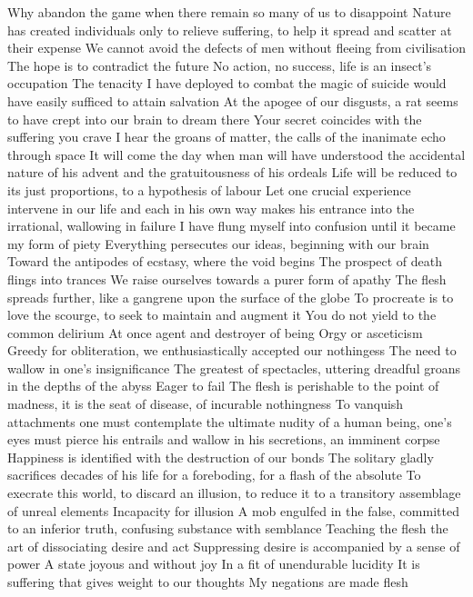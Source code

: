 \documentclass{article}
\begin{document}
Why abandon the game when there remain so many of us to disappoint
Nature has created individuals only to relieve suffering, to help it spread and scatter at their expense
We cannot avoid the defects of men without fleeing from civilisation
The hope is to contradict the future
No action, no success, life is an insect's occupation
The tenacity I have deployed to combat the magic of suicide would have easily sufficed to attain salvation
At the apogee of our disgusts, a rat seems to have crept into our brain to dream there
Your secret coincides with the suffering you crave
I hear the groans of matter, the calls of the inanimate echo through space
It will come the day when man will have understood the accidental nature of his advent and the gratuitousness of his ordeals
Life will be reduced to its just proportions, to a hypothesis of labour
Let one crucial experience intervene in our life and each in his own way makes his entrance into the irrational, wallowing in failure
I have flung myself into confusion until it became my form of piety
Everything persecutes our ideas, beginning with our brain
Toward the antipodes of ecstasy, where the void begins
The prospect of death flings into trances
We raise ourselves towards a purer form of apathy
The flesh spreads further, like a gangrene upon the surface of the globe
To procreate is to love the scourge, to seek to maintain and augment it
You do not yield to the common delirium
At once agent and destroyer of being
Orgy or asceticism
Greedy for obliteration, we enthusiastically accepted our nothingess
The need to wallow in one's insignificance
The greatest of spectacles, uttering dreadful groans in the depths of the abyss
Eager to fail
The flesh is perishable to the point of madness, it is the seat of disease, of incurable nothingness
To vanquish attachments one must contemplate the ultimate nudity of a human being, one's eyes must pierce his entrails and wallow in his secretions, an imminent corpse
Happiness is identified with the destruction of our bonds
The solitary gladly sacrifices decades of his life for a foreboding, for a flash of the absolute
To execrate this world, to discard an illusion, to reduce it to a transitory assemblage of unreal elements
Incapacity for illusion
A mob engulfed in the false, committed to an inferior truth, confusing substance with semblance
Teaching the flesh the art of dissociating desire and act
Suppressing desire is accompanied by a sense of power
A state joyous and without joy
In a fit of unendurable lucidity
It is suffering that gives weight to our thoughts
My negations are made flesh
\end{document}
